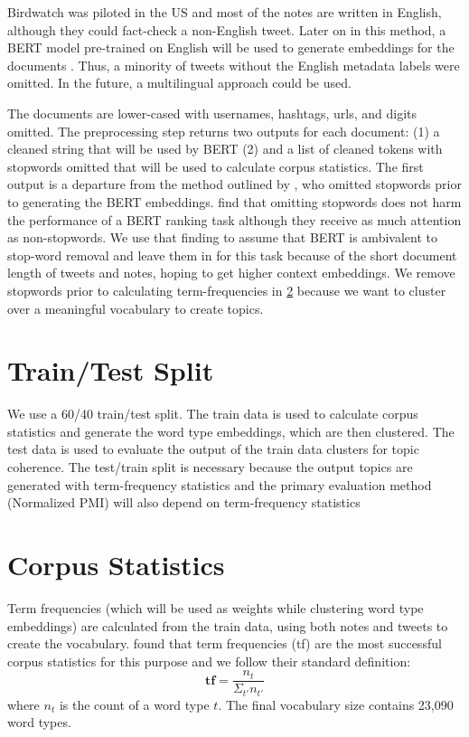 \documentclass [11pt, proquest] {uwthesis}[2020/02/24]
\begin{document}
Birdwatch was piloted in the US and most of the notes are written in English, although they could fact-check a non-English tweet. Later on in this method, a BERT model pre-trained on English \citep{DBLP:journals/corr/abs-1810-04805} will be used to generate embeddings for the documents . Thus, a minority of tweets without the English metadata labels were omitted. In the future, a multilingual approach could be used.

The documents are lower-cased with usernames, hashtags, urls, and digits omitted. The preprocessing step returns two outputs for each document: (1) a cleaned string that will be used by BERT (2) and a list of cleaned tokens with stopwords omitted that will be used to calculate corpus statistics. The first output  is a departure from the method outlined by \cite{sia-etal-2020-tired}, who omitted stopwords prior to generating the BERT embeddings. \cite{Qiao2019UnderstandingTB} find that omitting stopwords does not harm the performance of a BERT ranking task although they receive as much attention as non-stopwords. We use that finding to assume that BERT is ambivalent to stop-word removal and leave them in for this task because of the short document length of tweets and notes, hoping to get higher context embeddings. We remove stopwords prior to calculating term-frequencies in \ref{section:corpusstats} because we want to cluster over a meaningful vocabulary to create topics.

\section{Train/Test Split}\label{section:traintest}
We use a 60/40 train/test split. The train data is used to calculate corpus statistics and generate the word type embeddings, which are then clustered. The test data is used to evaluate the output of the train data clusters for topic coherence. The test/train split is necessary because the output topics are generated with term-frequency statistics and the primary evaluation method (Normalized PMI) will also depend on term-frequency statistics

\section{Corpus Statistics}\label{section:corpusstats}
Term frequencies (which will be used as weights while clustering word type embeddings) are calculated from the train data, using both notes and tweets to create the vocabulary. \cite{sia-etal-2020-tired} found that term frequencies (tf) are the most successful corpus statistics for this purpose and we follow their standard definition: $$ \textbf{tf} = \frac{n_t}{\Sigma_{t'}n_{t'}} $$  where $n_t$ is the count of a word type $t$. The final vocabulary size contains 23,090 word types.
\end{document}
